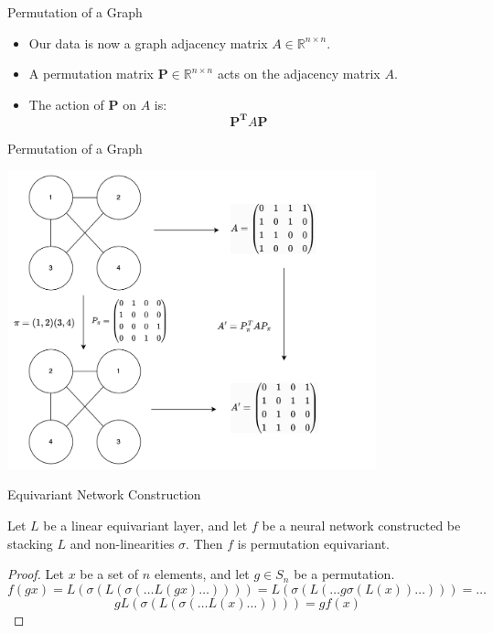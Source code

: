\documentclass{beamer}
\begin{document}
\begin{frame}{Permutation of a Graph}

    \begin{itemize}
        \setlength{\itemsep}{\fill}
        \item Our data is now a graph adjacency matrix $A \in \mathbb{R}^{n \times n}$. 
        \pause
        \item A permutation matrix $\boldsymbol{P} \in \mathbb{R}^{n \times n}$ acts on the adjacency matrix $A$.
        \pause
        \item The action of $\boldsymbol{P}$ on $A$ is:
        \[ \boldsymbol{P^T}A\boldsymbol{P} \]
    \end{itemize}
    
\end{frame}
\begin{frame}{Permutation of a Graph}
    \begin{center}
        \includegraphics[width=0.8\textwidth]{../figures/node_permutation.png}
    \end{center}
\end{frame}

\begin{frame}{Equivariant Network Construction}

    \begin{theorem}
        Let $L$ be a linear equivariant layer, and let $f$ be a neural network constructed be stacking $L$ and non-linearities $\sigma$. Then $f$ is permutation equivariant.
    \end{theorem}
    \pause
    \begin{proof}
        Let $x$ be a set of $n$ elements, and let $g \in S_n$ be a permutation.
        \pause
        \[ f(gx) = L(\sigma(L(\sigma(\ldots L(gx) \ldots)))) = L(\sigma(L( \ldots g\sigma(L(x)) \ldots))) = \ldots \]
        \pause
        \[ g L(\sigma(L(\sigma(\ldots L(x) \ldots)))) = gf(x) \]
    \end{proof}
    
    
\end{frame}
\end{document}
